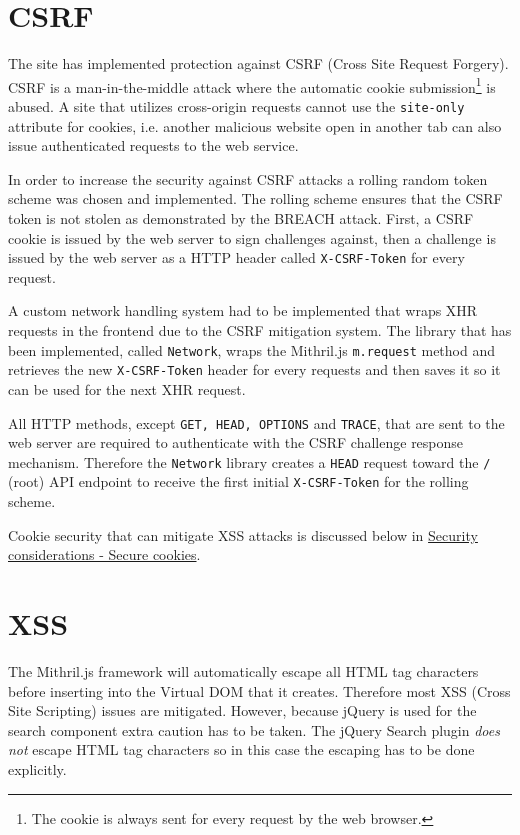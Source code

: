 \documentclass[12pt,a4paper]{report}
\begin{document}
\section{CSRF}
\label{subsec:csrf}
The site has implemented protection against CSRF (Cross Site Request Forgery). CSRF is a man-in-the-middle attack where the automatic cookie submission\footnote{The cookie is always sent for every request by the web browser.} is abused. A site that utilizes cross-origin requests cannot use the \texttt{site-only} attribute for cookies, i.e. another malicious website open in another tab can also issue authenticated requests to the web service\cite{rick}.

In order to increase the security against CSRF attacks a rolling random token scheme was chosen and implemented. The rolling scheme ensures that the CSRF token is not stolen as demonstrated by the BREACH attack\cite{breach}. First, a CSRF cookie is issued by the web server to sign challenges against, then a challenge is issued by the web server as a HTTP header called \texttt{X-CSRF-Token} for every request.

A custom network handling system had to be implemented that wraps XHR requests in the frontend due to the CSRF mitigation system.  The library that has been implemented, called \texttt{Network}\cite{roaster-network}, wraps the Mithril.js \texttt{m.request} method and retrieves the new \texttt{X-CSRF-Token} header for every requests and then saves it so it can be used for the next XHR request.

All HTTP methods, except \texttt{GET, HEAD, OPTIONS} and \texttt{TRACE}, that are sent to the web server are required to authenticate with the CSRF challenge response mechanism. Therefore the \texttt{Network} library creates a \texttt{HEAD} request toward the \texttt{/} (root) API endpoint to receive the first initial \texttt{X-CSRF-Token} for the rolling scheme.

Cookie security that can mitigate XSS attacks is discussed below in \hyperref[subsec:secure-cookies]{Security considerations - Secure cookies}.

\section{XSS}
The Mithril.js framework will automatically escape all HTML tag characters before inserting into the Virtual DOM that it creates\cite{mithril-trust}. Therefore most XSS (Cross Site Scripting) issues are mitigated. However, because jQuery is used for the search component extra caution has to be taken. The jQuery Search plugin \textit{does not} escape HTML tag characters so in this case the escaping has to be done explicitly.
\end{document}
